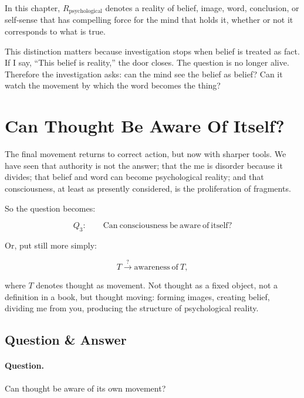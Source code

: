 \begin{definition}
In this chapter, \(R_{\mathrm{psychological}}\) denotes a reality of belief, image, word, conclusion, or self-sense that has compelling force for the mind that holds it, whether or not it corresponds to what is true.
\end{definition}

This distinction matters because investigation stops when belief is treated as fact. If I say, ``This belief is reality,'' the door closes. The question is no longer alive. Therefore the investigation asks: can the mind see the belief as belief? Can it watch the movement by which the word becomes the thing?

\section{Can Thought Be Aware Of Itself?}

The final movement returns to correct action, but now with sharper tools. We have seen that authority is not the answer; that the me is disorder because it divides; that belief and word can become psychological reality; and that consciousness, at least as presently considered, is the proliferation of fragments.

So the question becomes:

\begin{equation}
Q_3:\qquad
\mathrm{Can\ consciousness\ be\ aware\ of\ itself?}
\end{equation}

Or, put still more simply:

\begin{equation}
T \overset{?}{\longrightarrow} \mathrm{awareness\ of\ }T,
\end{equation}

where \(T\) denotes thought as movement. Not thought as a fixed object, not a definition in a book, but thought moving: forming images, creating belief, dividing me from you, producing the structure of psychological reality.

\subsection{Question \& Answer}

\paragraph{Question.}
Can thought be aware of its own movement?

